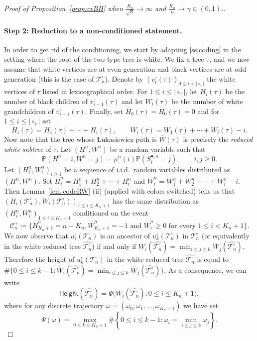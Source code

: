 \documentclass[10pt]{amsart}
\theoremstyle{definition}\newtheorem{defi}[theo]{Definition}\newtheorem{rema}[theo]{Remark}\newtheorem{exam}[theo]{Example}\newtheorem{exem}[theo]{Example}\newtheorem{nota}[theo]{Notation}
\providecommand{\abs}[1]{\lvert#1\rvert}
\def\mucn{\mu_{\circ}^{n}}
\def\Sbn{S^{\bullet,n}}
\def\oH{\overline{H}}
\def\Ts{\mathscr{T}}
\renewcommand\Pr[1]{\mathbb{P}\left(#1\right)}
\begin{document}
\begin{proof}[Proof of  Proposition~\ref{prop:cvBH}  when $\tfrac{K_{n}}{\sqrt{n}} \rightarrow \infty$ and $ \tfrac{K_{n}}{n}  \rightarrow \gamma \in (0,1)$.]
\paragraph*{Step 2: Reduction to a non-conditioned statement.}
In order to get rid of the conditioning, we start by adapting \cref{ss:coding} in the setting where the root of the two-type tree is white. We fix a tree $\tau$, and we now assume that white vertices are at even generation and black vertices are at odd generation (this is the case of $\Ts^{\circ}_{n}$).  Denote by $(v^{\circ}_{i}(\tau))_{0 \leq i < \abs{\circ_{\tau}}} $ the white vertices of $\tau$ listed in lexicographical order.  For $1 \leq i \leq \abs{\circ_{\tau}}$, let $H_{i}(\tau)$ be the number of black children of $v^{\circ}_{i-1}(\tau)$ and let $W_{i}(\tau)$ be the number of white grandchildren of $v^{\circ}_{i-1}(\tau)$. Finally, set $\oH_{0}(\tau)=\oH_{0}(\tau)=0$ and  for $1 \leq i \leq \abs{\circ_{\tau}}$ set
\[\oH_{i}(\tau)=H_{1}(\tau)+ \cdots+H_{i}(\tau), \qquad  \overline{W}_{i}(\tau)=W_{1}(\tau)+ \cdots+W_{i}(\tau)-i.\]
Now note that the tree whose {\L}ukasiewicz path is $\overline{W}(\tau)$ is precisely the \emph{reduced white subtree} of $\tau$.
Let $(H^{n},W^{n})$ be a random variable such that
 \begin{equation}
    \Pr{H^{n}=i,W^{n}=j}=\mucn(i) \Pr{\Sbn_{i}=j}, \qquad  i, j \geq 0.
    \label{eq:HW}
  \end{equation}
Let $(H^{n}_{i},W^{n}_{i})_{i \geq 1}$ be a sequence of i.i.d.~random variables distributed as $(H^{n},W^{n})$. Set $\overline{H}^{n}_{i}=H^{n}_{1}+H^{n}_{2}+ \cdots+H^{n}_{i}$ and  $\overline{W}^{n}_{i}=W_{1}^{n}+W^{n}_{2}+ \cdots+W^{n}_{i}-i$. Then Lemma~\ref{lem:codeRW} (ii) (applied with colors switched) tells us that $(H_{i}(\Ts_{n}^{\circ}) ,W_{i}(\Ts_{n}^{\circ}))_{1 \leq i \leq K_{n}+1}$ has the same distribution as $(H^{n}_{i},W^{n}_{i})_{1 \leq i \leq K_{n}+1}$ conditioned on the event
\[ \mathcal{C}^{+}_{n} \coloneqq \{\oH^{n}_{K_{n}+1}=n-K_{n},\overline{W}^{n}_{K_{n}+1}=-1 \textrm{ and } \overline{W}^{n}_{i} \geq 0 \textrm{ for every } 1 \leq i < K_{n}+1\}.\]
We now observe that $u^{\circ}_{i}(\Ts^{\circ}_{n})$ is an ancestor of $u^{\circ}_{k}(\Ts^{\circ}_{n})$ in $\Ts^{\circ}_{n}$
(or equivalently in the white reduced tree $\hat{\Ts^{\circ}_{n}}$)
if and only if $\overline{W}_{i}(\hat{\Ts^{\circ}_{n}})=\min_{i \leq j \leq k}  \overline{W}_{j}(\hat{\Ts^{\circ}_{n}})$.
Therefore the height of $u^{\circ}_{k}(\Ts^{\circ}_{n})$ in the white reduced tree $\hat{\Ts^{\circ}_{n}}$
 is equal to $ \# \{0 \leq i \leq k-1: \overline{W}_{i}(\hat{\Ts^{\circ}_{n}})=\min_{i \leq j \leq k}  \overline{W}_{j}(\hat{\Ts^{\circ}_{n}}) \}$. As a consequence, we can write
\[\mathsf{Height}(\hat{\Ts^{\circ}_{n}})= \Psi\big(  \overline{W}_{i}(\hat{\Ts^{\circ}_{n}}) :0 \leq i \leq K_{n}+1 \big),\]
where for any discrete trajectory $\omega=(\omega_{0},\omega_{1}, \ldots, \omega_{K_{n}+1})$ we have set
\[\Psi(\omega)= \max_{0 \leq k \leq K_{n}+1} \# \left\{0 \leq i \leq k-1: \omega_{i}=\min_{i \leq j \leq k}  \omega_{j} \right \}.\]



\end{proof}
\end{document}
